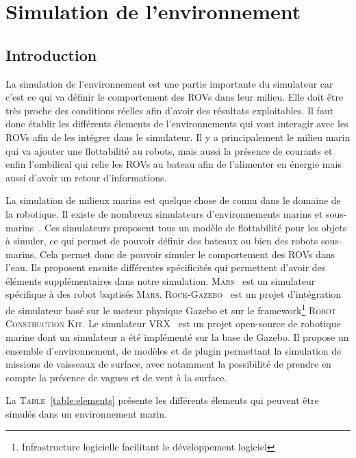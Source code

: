 \chapter{Simulation de l'environnement}
	
	\section{Introduction}

		La simulation de l'environnement est une partie importante du simulateur car c'est ce qui va définir le comportement des \gls{ROV}s dans leur milieu. Elle doit être très proche des conditions réelles afin d'avoir des résultats exploitables. Il faut donc établir les différents élements de l'environnements qui vont interagir avec les \gls{ROV}s afin de les intégrer dans le simulateur. Il y a principalement le milieu marin qui va ajouter une flottabilité au robots, mais aussi la présence de courants et enfin l'ombilical qui relie les \gls{ROV}s au bateau afin de l'alimenter en énergie mais aussi d'avoir un retour d'informations.

		La simulation de milieux marins est quelque chose de connu dans le domaine de la robotique. Il existe de nombreux simulateurs d'environnements marins et sous-marins~\cite{Manhaes_2016, bingham19toward, MARS, Rock}. Ces simulateurs proposent tous un modèle de flottabilité pour les objets à simuler, ce qui permet de pouvoir définir des bateaux ou bien des robots sous-marins. Cela permet donc de pouvoir simuler le comportement des \gls{ROV}s dans l'eau. Ils proposent ensuite différentes spécificités qui permettent d'avoir des éléments supplémentaires dans notre simulation. \textsc{Mars}~\cite{MARS} est un simulateur spécifique à des robot baptisés \textsc{Mars}. \textsc{Rock-Gazebo}~\cite{Rock} est un projet d'intégration de simulateur basé sur le moteur physique \gls{Gazebo} et sur le framework\footnote{Infrastructure logicielle facilitant le développement logiciel} \textsc{Robot Construction Kit}. Le simulateur \textsc{VRX}~\cite{bingham19toward} est un projet open-source de robotique marine dont un simulateur a été implémenté sur la base de \gls{Gazebo}. Il propose un ensemble d'environnement, de modèles et de plugin permettant la simulation de missions de vaisseaux de surface, avec notamment la possibilité de prendre en compte la présence de vagues et de vent à la surface.

		La \textsc{Table}~\ref{table:elements} présente les différents élements qui peuvent être simulés dans un environnement marin.

